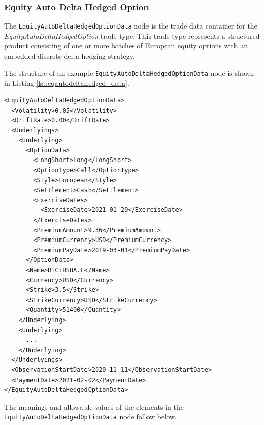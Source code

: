 \subsubsection{Equity Auto Delta Hedged Option}

The \lstinline!EquityAutoDeltaHedgedOptionData! node is the trade data container for the
\emph{EquityAutoDeltaHedgedOption} trade type.  This trade type represents a structured
product consisting of one or more batches of European equity options with an embedded
discrete delta-hedging strategy.

The structure of an example \lstinline!EquityAutoDeltaHedgedOptionData! node is shown in
Listing \ref{lst:eqautodeltahedged_data}.

\begin{listing}[H]
\begin{verbatim}
<EquityAutoDeltaHedgedOptionData>
  <Volatility>0.05</Volatility>
  <DriftRate>0.00</DriftRate>
  <Underlyings>
    <Underlying>
      <OptionData>
        <LongShort>Long</LongShort>
        <OptionType>Call</OptionType>
        <Style>European</Style>
        <Settlement>Cash</Settlement>
        <ExerciseDates>
          <ExerciseDate>2021-01-29</ExerciseDate>
        </ExerciseDates>
        <PremiumAmount>9.36</PremiumAmount>
        <PremiumCurrency>USD</PremiumCurrency>
        <PremiumPayDate>2019-03-01</PremiumPayDate>
      </OptionData>
      <Name>RIC:HSBA.L</Name>
      <Currency>USD</Currency>
      <Strike>3.5</Strike>
      <StrikeCurrency>USD</StrikeCurrency>
      <Quantity>51400</Quantity>
    </Underlying>
    <Underlying>
      ...
    </Underlying>
  </Underlyings>
  <ObservationStartDate>2020-11-11</ObservationStartDate>
  <PaymentDate>2021-02-02</PaymentDate>
</EquityAutoDeltaHedgedOptionData>
\end{verbatim}
\caption{Equity Auto Delta Hedged Option data}
\label{lst:eqautodeltahedged_data}
\end{listing}

The meanings and allowable values of the elements in the
\lstinline!EquityAutoDeltaHedgedOptionData! node follow below.

